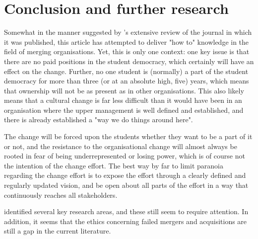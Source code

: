 \section{Conclusion and further research}

Somewhat in the manner suggested by \autocite{pettigrew-woodman-cameron:studying-organizational-change-and-development:2001}'s extensive review of the journal in which it was published, this article has attempted to deliver "how to" knowledge in the field of merging organisations. Yet, this is only one context: one key issue is that there are no paid positions in the student democracy, which certainly will have an effect on the change. Further, no one student is (normally) a part of the student democracy for more than three (or at an absolute high, five) years, which means that ownership will not be as present as in other organisations. This also likely means that a cultural change is far less difficult than it would have been in an organisation where the upper management is well defined and established, and there is already established a "way we do things around here".

The change will be forced upon the students whether they want to be a part of it or not, and the resistance to the organisational change will almost always be rooted in fear of being underrepresented or losing power, which is of course not the intention of the change effort. The best way by far to limit paranoia regarding the change effort is to expose the effort through a clearly defined and regularly updated vision, and be open about all parts of the effort in a way that continuously reaches all stakeholders.

\autocite{pettigrew-woodman-cameron:studying-organizational-change-and-development:2001} identified several key research areas, and these still seem to require attention. In addition, it seems that the ethics concerning failed mergers and acquisitions are still a gap in the current literature.
